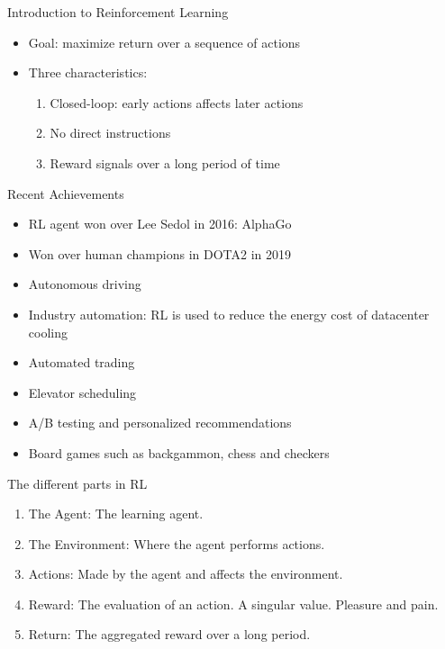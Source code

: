 \documentclass[10pt]{beamer}
\begin{document}
\begin{frame}{Introduction to Reinforcement Learning}

\begin{itemize}
\item {\color{uured} Goal}: maximize return over a sequence of actions\pause
\item Three characteristics:
\begin{enumerate}
\item Closed-loop: early actions affects later actions\pause
\item No direct instructions\pause
\item Reward signals over a long period of time
\end{enumerate}
\end{itemize}

\end{frame}



\begin{frame}{Recent Achievements}

\begin{itemize}
\item RL agent won over Lee Sedol in 2016: {\color{uured} AlphaGo}\pause
\item Won over human champions in {\color{uured} DOTA2} in 2019\pause
\item Autonomous driving\pause
\item Industry automation: RL is used to reduce the energy cost of datacenter cooling\pause
\item Automated trading\pause
\item Elevator scheduling\pause
\item A/B testing and personalized recommendations\pause
\item Board games such as backgammon, chess and checkers
\end{itemize}

\end{frame}



\begin{frame}{The different parts in RL}

\begin{enumerate}
\item The {\color{uured} Agent}: The learning agent. \pause
\item The {\color{uured} Environment}: Where the agent performs actions.\pause
\item {\color{uured} Actions}: Made by the agent and affects the environment.\pause
\item {\color{uured} Reward}: The evaluation of an action. A singular value. Pleasure and pain.\pause
\item {\color{uured} Return}: The aggregated reward over a long period.
\end{enumerate}

\end{frame}
\end{document}
